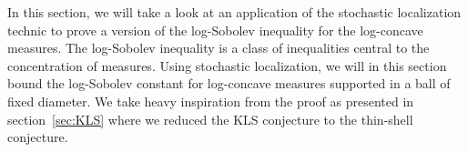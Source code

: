 In this section, we will take a look at an application of the stochastic localization technic 
to prove a version of the log-Sobolev inequality for the log-concave measures. The log-Sobolev inequality 
is a class of inequalities central to the concentration of measures. Using stochastic localization, 
we will in this section bound the log-Sobolev constant for log-concave measures 
supported in a ball of fixed diameter. We take heavy inspiration from the proof as presented in section~\ref{sec:KLS}
where we reduced the KLS conjecture to the thin-shell conjecture.






